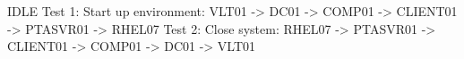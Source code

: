IDLE
Test 1: Start up environment: VLT01 -> DC01 -> COMP01 -> CLIENT01 -> PTASVR01 -> RHEL07
Test 2: Close system: RHEL07 -> PTASVR01 -> CLIENT01 -> COMP01 -> DC01 -> VLT01